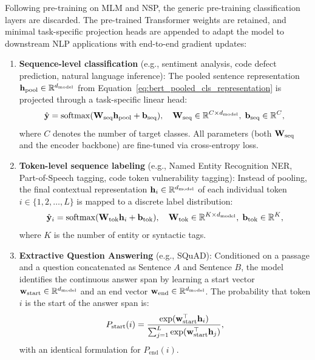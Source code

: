 \documentclass[../../main.tex]{subfiles}
\begin{document}
Following pre-training on MLM and NSP, the generic pre-training classification layers are discarded. The pre-trained Transformer weights are retained, and minimal task-specific projection heads are appended to adapt the model to downstream NLP applications with end-to-end gradient updates:
\begin{enumerate}
    \item \textbf{Sequence-level classification} (e.g., sentiment analysis, code defect prediction, natural language inference):
    The pooled sentence representation $\mathbf{h}_{\text{pool}} \in \mathbb{R}^{d_{\text{model}}}$ from Equation~\eqref{eq:bert_pooled_cls_representation} is projected through a task-specific linear head:
    \begin{equation}
    \label{eq:bert_finetune_seq_classification}
    \hat{\mathbf{y}} = \operatorname{softmax}(\mathbf{W}_{\text{seq}} \mathbf{h}_{\text{pool}} + \mathbf{b}_{\text{seq}}), \quad \mathbf{W}_{\text{seq}} \in \mathbb{R}^{C \times d_{\text{model}}}, \; \mathbf{b}_{\text{seq}} \in \mathbb{R}^C,
    \end{equation}
    where $C$ denotes the number of target classes. All parameters (both $\mathbf{W}_{\text{seq}}$ and the encoder backbone) are fine-tuned via cross-entropy loss.
    \item \textbf{Token-level sequence labeling} (e.g., Named Entity Recognition NER, Part-of-Speech tagging, code token vulnerability tagging):
    Instead of pooling, the final contextual representation $\mathbf{h}_i \in \mathbb{R}^{d_{\text{model}}}$ of each individual token $i \in \{1, 2, \dots, L\}$ is mapped to a discrete label distribution:
    \begin{equation}
    \label{eq:bert_finetune_token_classification}
    \hat{\mathbf{y}}_i = \operatorname{softmax}(\mathbf{W}_{\text{tok}} \mathbf{h}_i + \mathbf{b}_{\text{tok}}), \quad \mathbf{W}_{\text{tok}} \in \mathbb{R}^{K \times d_{\text{model}}}, \; \mathbf{b}_{\text{tok}} \in \mathbb{R}^K,
    \end{equation}
    where $K$ is the number of entity or syntactic tags.
    \item \textbf{Extractive Question Answering} (e.g., SQuAD):
    Conditioned on a passage and a question concatenated as Sentence $A$ and Sentence $B$, the model identifies the continuous answer span by learning a start vector $\mathbf{w}_{\text{start}} \in \mathbb{R}^{d_{\text{model}}}$ and an end vector $\mathbf{w}_{\text{end}} \in \mathbb{R}^{d_{\text{model}}}$. The probability that token $i$ is the start of the answer span is:
    \begin{equation}
    \label{eq:bert_squad_start_prob}
    P_{\text{start}}(i) = \frac{\exp(\mathbf{w}_{\text{start}}^\top \mathbf{h}_i)}{\sum_{j=1}^L \exp(\mathbf{w}_{\text{start}}^\top \mathbf{h}_j)},
    \end{equation}
    with an identical formulation for $P_{\text{end}}(i)$.
\end{enumerate}
\end{document}
